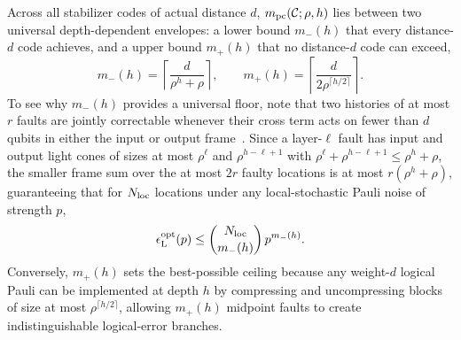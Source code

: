 \documentclass[aps,prl,reprint,notitlepage,nofootinbib,nobibnotes]{revtex4-2}
\begin{document}
Across all stabilizer codes of actual distance $d$, $m_{\rm pc}(\mathcal C;\rho,h)$ lies between two universal depth-dependent envelopes: a lower bound $m_-(h)$ that every distance-$d$ code achieves, and a upper bound $m_+(h)$ that no distance-$d$ code can exceed,
\begin{equation}\label{eq:envelopes-def}
 m_-(h)=\left\lceil\frac{d}{\rho^h+\rho}\right\rceil,
 \qquad
 m_+(h)=\left\lceil\frac{d}{2\rho^{\lceil h/2\rceil}}\right\rceil .
\end{equation}
To see why $m_-(h)$ provides a universal floor, note that two histories of at most $r$ faults are jointly correctable whenever their cross term acts on fewer than $d$ qubits in either the input or output frame~\cite{KL}. Since a layer-$\ell$ fault has input and output light cones of sizes at most $\rho^\ell$ and $\rho^{h-\ell+1}$ with $\rho^\ell+\rho^{h-\ell+1}\le\rho^h+\rho$, the smaller frame sum over the at most $2r$ faulty locations is at most $r(\rho^h+\rho)$, guaranteeing that for $N_{\rm loc}$ locations under any local-stochastic Pauli noise of strength $p$,
\begin{equation}\label{eq:discussion-noise-exponent}
 \epsilon_{\rm L}^{\rm opt}(p)
 \le \binom{N_{\rm loc}}{m_-(h)}\,p^{m_-(h)}.
\end{equation}
Conversely, $m_+(h)$ sets the best-possible ceiling because any weight-$d$ logical Pauli can be implemented at depth $h$ by compressing and uncompressing blocks of size at most $\rho^{\lceil h/2\rceil}$, allowing $m_+(h)$ midpoint faults to create indistinguishable logical-error branches.
\end{document}
